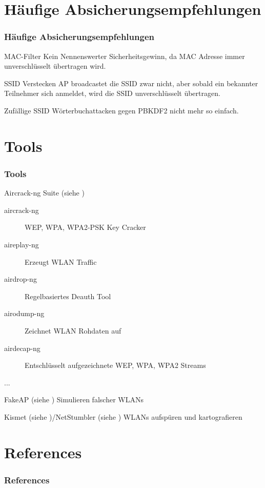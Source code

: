 \documentclass{beamer}
\begin{document}
\section{Häufige Absicherungsempfehlungen}
\begin{frame}
\frametitle{Häufige Absicherungsempfehlungen}
\begin{block}{MAC-Filter}
Kein Nennenswerter Sicherheitsgewinn, da MAC Adresse immer unverschlüsselt übertragen wird.
\end{block}
\begin{block}{SSID Verstecken}
AP broadcastet die SSID zwar nicht, aber sobald ein bekannter Teilnehmer sich anmeldet, wird die SSID unverschlüsselt übertragen.
\end{block} 
\begin{block}{Zufällige SSID}
Wörterbuchattacken gegen PBKDF2 nicht mehr so einfach.
\end{block}
\end{frame}

\section{Tools}
\begin{frame}
\frametitle{Tools}
\begin{block}{Aircrack-ng Suite (siehe \cite{aircrack})}
	\begin{description}
		\item[aircrack-ng] WEP, WPA, WPA2-PSK Key Cracker
		\item[aireplay-ng] Erzeugt WLAN Traffic
		\item[airdrop-ng] Regelbasiertes Deauth Tool
		\item[airodump-ng] Zeichnet WLAN Rohdaten auf
		\item[airdecap-ng] Entschlüsselt aufgezeichnete WEP, WPA, WPA2 Streams
		\item[...]
	\end{description}
\end{block}
\begin{block}{FakeAP (siehe \cite{fakeap})}
Simulieren falscher WLANs
\end{block}
\begin{block}{Kismet (siehe \cite{kismet})/NetStumbler (siehe \cite{netstumbler})}
WLANs aufspüren und kartografieren
\end{block}
\end{frame}

\section{References}
\begin{frame}[allowframebreaks]
\frametitle{References}


\end{frame}
\end{document}

